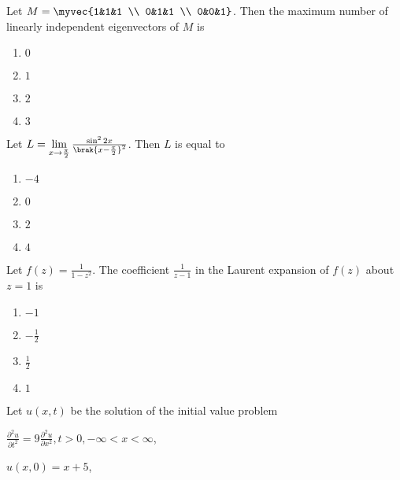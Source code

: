 \iffalse
\chapter{2007}
\author{EE24BTECH11021 - Eshan Ray}
\section{xe}
\fi
    \item Let $M=\myvec{1&1&1 \\ 0&1&1 \\ 0&0&1}$. Then the maximum number of linearly independent eigenvectors of $M$ is
        \begin{enumerate}
            \item $0$
            \item $1$
            \item $2$
            \item $3$
        \end{enumerate}
    
    \item Let $L=\lim\limits_{x\to\frac{\pi}{2}}\frac{\sin^22x}{\brak{x-\frac{\pi}{2}}^2}$. Then $L$ is equal to
        \begin{enumerate}
            \item $-4$
            \item $0$
            \item $2$
            \item $4$
        \end{enumerate}
    
    \item Let $f(z)=\frac{1}{1-z^2}$. The coefficient $\frac{1}{z-1}$ in the Laurent expansion of $f(z)$ about $z=1$ is
        \begin{enumerate}
            \item $-1$
            \item $-\frac{1}{2}$
            \item $\frac{1}{2}$
            \item $1$
        \end{enumerate}

    \item Let $u(x,t)$ be the solution of the initial value problem

        $\frac{\partial^2u}{\partial t^2}=9\frac{\partial^2u}{\partial x^2},t>0,-\infty<x<\infty$,

        $u(x,0)=x+5$,

